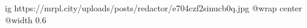  
 
 
 
 

\ifcmt
  ig https://mrpl.city/uploads/posts/redactor/e704czf2sinucb0q.jpg
  @wrap center
  @width 0.6
\fi
